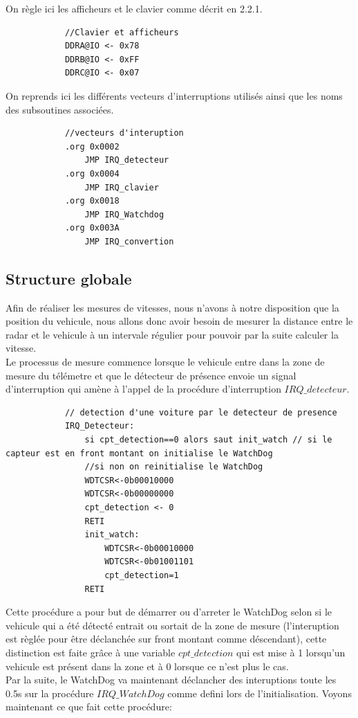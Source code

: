 \documentclass[a4paper, 12pt]{article}
\begin{document}
		On règle ici les afficheurs et le clavier comme décrit en 2.2.1.
		\begin{lstlisting}
			//Clavier et afficheurs
			DDRA@IO <- 0x78
			DDRB@IO <- 0xFF	 
			DDRC@IO <- 0x07
		\end{lstlisting}

		On reprends ici les différents vecteurs d'interruptions utilisés ainsi que les noms des subsoutines associées.
		\begin{lstlisting}
			//vecteurs d'interuption
			.org 0x0002
				JMP IRQ_detecteur
			.org 0x0004
				JMP IRQ_clavier
			.org 0x0018
				JMP IRQ_Watchdog
			.org 0x003A
				JMP IRQ_convertion
		\end{lstlisting}
		\subsection{Structure globale}
		Afin de réaliser les mesures de vitesses, nous n'avons à notre disposition que la position du vehicule, nous allons donc avoir besoin de mesurer la distance entre le radar et le vehicule à un intervale régulier pour pouvoir par la suite calculer la vitesse. \\
		Le processus de mesure commence lorsque le vehicule entre dans la zone de mesure du télémetre et que le détecteur de présence envoie un signal d'interruption qui amène à l'appel de la procédure d'interruption $IRQ\_detecteur$.
		
		\begin{lstlisting}
			// detection d'une voiture par le detecteur de presence  
			IRQ_Detecteur:
				si cpt_detection==0 alors saut init_watch // si le capteur est en front montant on initialise le WatchDog
				//si non on reinitialise le WatchDog 
				WDTCSR<-0b00010000
				WDTCSR<-0b00000000
				cpt_detection <- 0 
				RETI
				init_watch: 
					WDTCSR<-0b00010000
					WDTCSR<-0b01001101
					cpt_detection=1
				RETI
		\end{lstlisting}
		Cette procédure a pour but de démarrer ou d'arreter le WatchDog selon si le vehicule qui a été détecté entrait ou sortait de la zone de mesure (l'interuption est règlée pour être déclanchée sur front montant comme déscendant), cette distinction est faite grâce à une variable $cpt\_detection$ qui est mise à 1 lorsqu'un vehicule est présent dans la zone et à 0 lorsque ce n'est plus le cas.\\
		
		Par la suite, le WatchDog va maintenant déclancher des interuptions toute les 0.5s sur la procédure $IRQ\_WatchDog$ comme defini lors de l'initialisation. Voyons maintenant ce que fait cette procédure:\\
		
\end{document}
